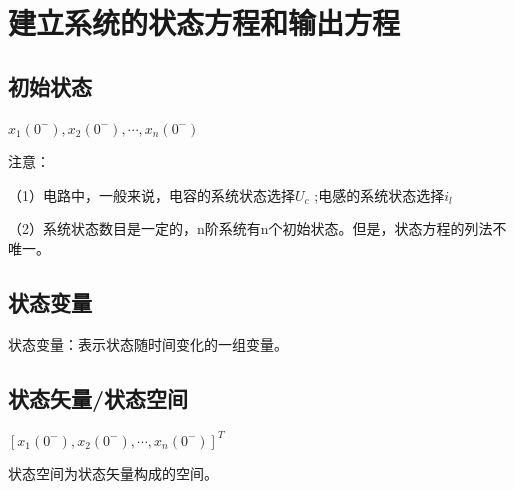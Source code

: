 \documentclass[UTF8]{ctexart}
\begin{document}
\section{建立系统的状态方程和输出方程}
\subsection{初始状态}
$x_1(0^-),x_2(0^-),\cdots ,x_n(0^-)$ \par
注意：\par
（1）电路中，一般来说，电容的系统状态选择$U_c$ ;电感的系统状态选择$i_l$  \par
（2）系统状态数目是一定的，n阶系统有n个初始状态。但是，状态方程的列法不唯一。 \par
\subsection{状态变量}
状态变量：表示状态随时间变化的一组变量。 \par
\subsection{状态矢量/状态空间}
$[ x_1(0^-),x_2(0^-),\cdots ,x_n(0^-)]^T$ \par
状态空间为状态矢量构成的空间。\par
\end{document}
